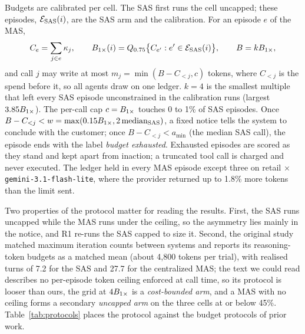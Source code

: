 Budgets are calibrated per cell. The SAS first runs the cell uncapped; these episodes, $\mathcal{E}_{\text{\textup{SAS}}}(i)$, are the SAS arm and the calibration. For an episode $e$ of the MAS,
\begin{equation}
\label{eq:budget}
C_e=\sum_{j\in e}\kappa_j,\qquad B_{1\times}(i)=Q_{0.75}\big\{C_{e'}:e'\in\mathcal{E}_{\text{\textup{SAS}}}(i)\big\},\qquad B=kB_{1\times},
\end{equation}
and call $j$ may write at most $m_j=\min(B-C_{<j},c)$ tokens, where $C_{<j}$ is the spend before it, so all agents draw on one ledger. $k = 4$ is the smallest multiple that left every SAS episode unconstrained in the calibration runs (largest $3.85B_{1\times}$). The per-call cap $c = B_{1\times}$ touches 0 to 1\% of SAS episodes. Once $B-C_{<j}<w=\max(0.15B_{1\times}, 2\,\text{median}_{\text{\textup{SAS}}})$, a fixed notice tells the system to conclude with the customer; once $B-C_{<j}<a_{\min}$ (the median SAS call), the episode ends with the label \emph{budget exhausted}. Exhausted episodes are scored as they stand and kept apart from inaction; a truncated tool call is charged and never executed. The ledger held in every MAS episode except three on retail $\times$ \texttt{gemini-3.1-flash-lite}, where the provider returned up to 1.8\% more tokens than the limit sent.

Two properties of the protocol matter for reading the results. First, the SAS runs uncapped while the MAS runs under the ceiling, so the asymmetry lies mainly in the notice, and R1 re-runs the SAS capped to size it. Second, the original study matched maximum iteration counts between systems and reports its reasoning-token budgets as a matched mean (about 4,800 tokens per trial), with realised turns of 7.2 for the SAS and 27.7 for the centralized MAS; the text we could read describes no per-episode token ceiling enforced at call time, so its protocol is looser than ours, the grid at $4B_{1\times}$ is a \emph{cost-bounded arm}, and a MAS with no ceiling forms a secondary \emph{uncapped arm} on the three cells at or below 45\%. Table~\ref{tab:protocols} places the protocol against the budget protocols of prior work.

